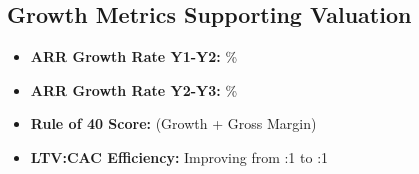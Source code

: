 \subsection{Growth Metrics Supporting Valuation}
\begin{itemize}
    \item \textbf{ARR Growth Rate Y1-Y2:} \%
    \item \textbf{ARR Growth Rate Y2-Y3:} \%
    \item \textbf{Rule of 40 Score:}  (Growth + Gross Margin)
    \item \textbf{LTV:CAC Efficiency:} Improving from \numint{\subLTV/(\effectiveCACYearOne - \merchOffsetSubsCalc)}:1 to \numint{\subLTV/(\effectiveCACYearThree - \merchOffsetSubsCalc)}:1
\end{itemize}